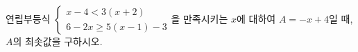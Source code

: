 연립부등식 $\begin{cases} x-4<3(x+2) \\ 6-2x\ge 5(x-1)-3 \end{cases}$을 만족시키는 $x$에 대하여 $A=-x+4$일 때, $A$의 최솟값을 구하시오.
